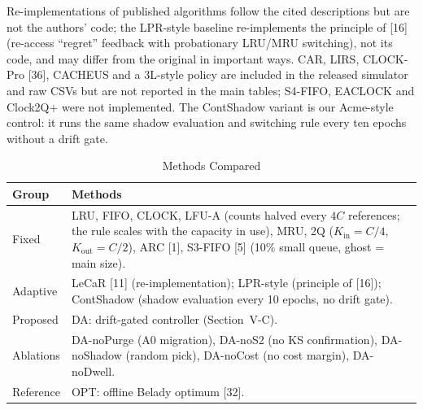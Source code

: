 \documentclass[journal,onecolumn]{IEEEtran}
\begin{document}
Re-implementations of published
algorithms follow the cited descriptions but are not the authors' code; the
LPR-style baseline re-implements the principle of [16] (re-access ``regret''
feedback with probationary LRU/MRU switching), not its code, and may differ
from the original in important ways. CAR, LIRS, CLOCK-Pro [36], CACHEUS and a
3L-style policy are included in the released simulator and raw CSVs but are not
reported in the main tables; S4-FIFO, EACLOCK and Clock2Q+ were not implemented.
The ContShadow variant is our Acme-style control: it runs the same shadow
evaluation and switching rule every ten epochs without a drift gate.

\begin{table}[!t]
\caption{Methods Compared}
\label{tab:methods}
\footnotesize
\begin{tabular}{@{}p{}p{}@{}}
\toprule
Group & Methods \\
\midrule
Fixed & LRU, FIFO, CLOCK, LFU-A (counts halved every $4C$ references; the rule scales with the capacity in use), MRU, 2Q ($K_{\mathrm{in}} = C/4$, $K_{\mathrm{out}} = C/2$), ARC [1], S3-FIFO [5] (10\% small queue, ghost = main size). \\
Adaptive & LeCaR [11] (re-implementation); LPR-style (principle of [16]); ContShadow (shadow evaluation every 10 epochs, no drift gate). \\
Proposed & DA: drift-gated controller (Section~V-C). \\
Ablations & DA-noPurge (A0 migration), DA-noS2 (no KS confirmation), DA-noShadow (random pick), DA-noCost (no cost margin), DA-noDwell. \\
Reference & OPT: offline Belady optimum [32]. \\
\bottomrule
\end{tabular}
\end{table}
\end{document}
